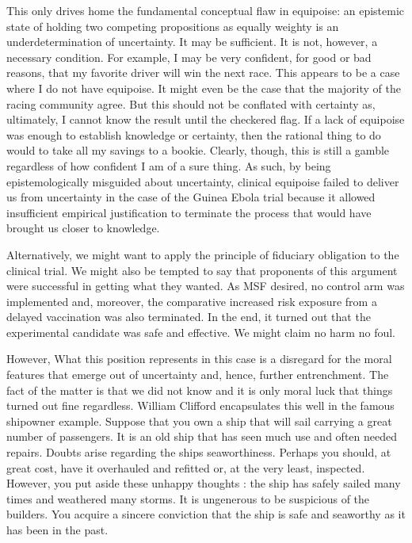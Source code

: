 \documentclass[letterpaper,notitlepage,12pt]{article}
\begin{document}
This only drives home the fundamental conceptual flaw in equipoise: an
epistemic state of holding two competing propositions as equally weighty is an
underdetermination of uncertainty.
It may be sufficient. It is not, however, a necessary condition.
For example, I may be very confident, for good or bad reasons, that my favorite 
driver will win the next race.
This appears to be a case where I do not have equipoise.
It might even be the case that the majority of the racing community agree.
But this should not be conflated with certainty as, ultimately, I cannot know
the result until the checkered flag.
If a lack of equipoise was enough to establish knowledge or certainty, then the
rational thing to do would to take all my savings to a bookie.
Clearly, though, this is still a gamble regardless of how confident I am of a
sure thing.
As such, by being epistemologically misguided about uncertainty,
clinical equipoise failed to deliver us from uncertainty in the case of the
Guinea Ebola trial because it allowed insufficient empirical justification to
terminate the process that would have brought us closer to knowledge.

Alternatively, we might want to apply the principle of fiduciary obligation to
the clinical trial.
We might also be tempted to say that proponents of this argument were successful
in getting what they wanted.
As MSF desired, no control arm was implemented and, moreover, the comparative
increased risk exposure from a delayed vaccination was also terminated.
In the end, it turned out that the experimental candidate was safe and
effective.
We might claim no harm no foul.

However, What this position represents in this case is a disregard for the moral
features that emerge out of uncertainty and, hence, further entrenchment.
The fact of the matter is that we did not know and it is only moral luck that
things turned out fine regardless.
William Clifford encapsulates this well in the famous shipowner example.
Suppose that you own a ship that will sail carrying a great number of
passengers.
It is an old ship that has seen much use and often needed repairs.
Doubts arise regarding the ships seaworthiness.
Perhaps you should, at great cost, have it overhauled and refitted or, at the
very least, inspected.
However, you put aside these unhappy thoughts : the ship has safely sailed many
times and weathered many storms.
It is ungenerous to be suspicious of the builders.
You acquire a sincere conviction that the ship is safe and seaworthy as it has
been in the past.
\end{document}
